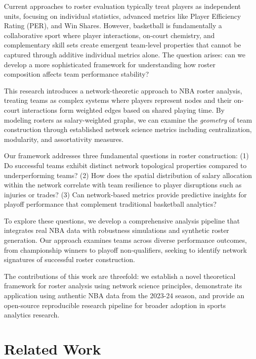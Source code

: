 \documentclass[11pt]{article}
\begin{document}
Current approaches to roster evaluation typically treat players as independent units, focusing on individual statistics, advanced metrics like Player Efficiency Rating (PER), and Win Shares. However, basketball is fundamentally a collaborative sport where player interactions, on-court chemistry, and complementary skill sets create emergent team-level properties that cannot be captured through additive individual metrics alone. The question arises: can we develop a more sophisticated framework for understanding how roster composition affects team performance stability?

This research introduces a network-theoretic approach to NBA roster analysis, treating teams as complex systems where players represent nodes and their on-court interactions form weighted edges based on shared playing time. By modeling rosters as salary-weighted graphs, we can examine the \textit{geometry} of team construction through established network science metrics including centralization, modularity, and assortativity measures.

Our framework addresses three fundamental questions in roster construction: (1) Do successful teams exhibit distinct network topological properties compared to underperforming teams? (2) How does the spatial distribution of salary allocation within the network correlate with team resilience to player disruptions such as injuries or trades? (3) Can network-based metrics provide predictive insights for playoff performance that complement traditional basketball analytics?

To explore these questions, we develop a comprehensive analysis pipeline that integrates real NBA data with robustness simulations and synthetic roster generation. Our approach examines teams across diverse performance outcomes, from championship winners to playoff non-qualifiers, seeking to identify network signatures of successful roster construction.

The contributions of this work are threefold: we establish a novel theoretical framework for roster analysis using network science principles, demonstrate its application using authentic NBA data from the 2023-24 season, and provide an open-source reproducible research pipeline for broader adoption in sports analytics research.

\section{Related Work}
\end{document}
